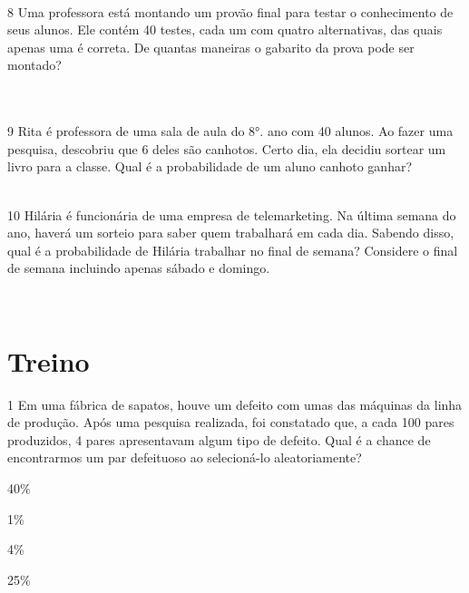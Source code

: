 \\

\num{8} Uma professora está montando um provão final para testar o
conhecimento de seus alunos. Ele contém 40 testes, cada um com quatro
alternativas, das quais apenas uma é correta. De quantas maneiras o
gabarito da prova pode ser montado?

\\
\\

\num{9} Rita é professora de uma sala de aula do 8°. ano com 40 alunos. Ao
fazer uma pesquisa, descobriu que 6 deles são canhotos. Certo dia, ela
decidiu sortear um livro para a classe. Qual é a probabilidade de um
aluno canhoto ganhar?

\\

\num{10} Hilária é funcionária de uma empresa de telemarketing. Na última
semana do ano, haverá um sorteio para saber quem trabalhará em cada dia.
Sabendo disso, qual é a probabilidade de Hilária trabalhar no final de
semana? Considere o final de semana incluindo apenas sábado e domingo.

\\

\section{Treino}

\num{1} Em uma fábrica de sapatos, houve um defeito com umas das máquinas da
linha de produção. Após uma pesquisa realizada, foi constatado que, a
cada 100 pares produzidos, 4 pares apresentavam algum tipo de defeito.
Qual é a chance de encontrarmos um par defeituoso ao selecioná-lo
aleatoriamente?
\item 40\%
\item 1\%
\item 4\%
\item 25\%



